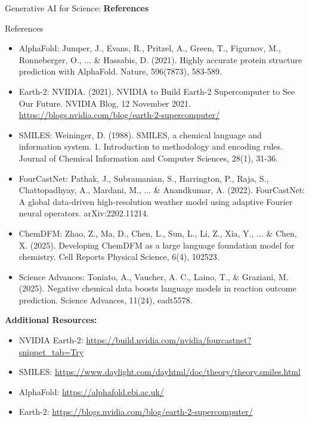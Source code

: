 \begin{frame}{}
    \LARGE Generative AI for Science: \textbf{References}
\end{frame}

\begin{frame}[allowframebreaks]{References}
    \begin{itemize}
        \item AlphaFold: Jumper, J., Evans, R., Pritzel, A., Green, T., Figurnov, M., Ronneberger, O., ... \& Hassabis, D. (2021). Highly accurate protein structure prediction with AlphaFold. Nature, 596(7873), 583-589.
        \item Earth-2: NVIDIA. (2021). NVIDIA to Build Earth-2 Supercomputer to See Our Future. NVIDIA Blog, 12 November 2021. \url{https://blogs.nvidia.com/blog/earth-2-supercomputer/}
        \item SMILES: Weininger, D. (1988). SMILES, a chemical language and information system. 1. Introduction to methodology and encoding rules. Journal of Chemical Information and Computer Sciences, 28(1), 31-36.
    \end{itemize}
    \framebreak
    \begin{itemize}
        \item FourCastNet: Pathak, J., Subramanian, S., Harrington, P., Raja, S., Chattopadhyay, A., Mardani, M., ... \& Anandkumar, A. (2022). FourCastNet: A global data-driven high-resolution weather model using adaptive Fourier neural operators. arXiv:2202.11214.
        \item ChemDFM: Zhao, Z., Ma, D., Chen, L., Sun, L., Li, Z., Xia, Y., ... \& Chen, X. (2025). Developing ChemDFM as a large language foundation model for chemistry. Cell Reports Physical Science, 6(4), 102523.
        \item Science Advances: Toniato, A., Vaucher, A. C., Laino, T., \& Graziani, M. (2025). Negative chemical data boosts language models in reaction outcome prediction. Science Advances, 11(24), eadt5578.
    \end{itemize}
    \framebreak
    \textbf{Additional Resources:}
    \begin{itemize}
        \item NVIDIA Earth-2: \url{https://build.nvidia.com/nvidia/fourcastnet?snippet_tab=Try}
        \item SMILES: \url{https://www.daylight.com/dayhtml/doc/theory/theory.smiles.html}
        \item AlphaFold: \url{https://alphafold.ebi.ac.uk/}
        \item Earth-2: \url{https://blogs.nvidia.com/blog/earth-2-supercomputer/}
    \end{itemize}
\end{frame}
